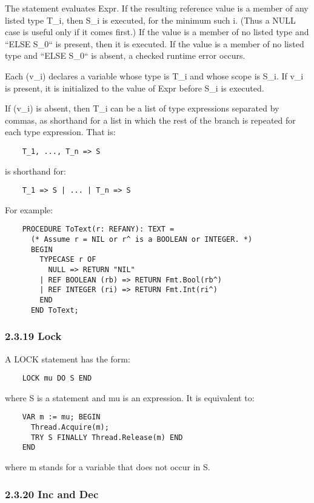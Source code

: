 \documentclass[10pt]{article}
\begin{document}
 The statement evaluates Expr. If the resulting reference value is a member of any listed type T\_i, then S\_i is executed, for the minimum such i. (Thus a NULL case is useful only if it comes first.) If the value is a member of no listed type and ``ELSE S\_0`` is present, then it is executed. If the value is a member of no listed type and ``ELSE S\_0`` is absent, a checked runtime error occurs. 


  Each (v\_i) declares a variable whose type is T\_i and whose scope is S\_i. If v\_i is present, it is initialized to the value of Expr before S\_i is executed. 


  If (v\_i) is absent, then T\_i can be a list of type expressions separated by commas, as shorthand for a list in which the rest of the branch is repeated for each type expression. That is: 
\begin{verbatim}
    T_1, ..., T_n => S
\end{verbatim}
 is shorthand for: 
\begin{verbatim}
    T_1 => S | ... | T_n => S
\end{verbatim}



  For example: 
\begin{verbatim}
    PROCEDURE ToText(r: REFANY): TEXT =
      (* Assume r = NIL or r^ is a BOOLEAN or INTEGER. *)
      BEGIN
        TYPECASE r OF
          NULL => RETURN "NIL"
        | REF BOOLEAN (rb) => RETURN Fmt.Bool(rb^)
        | REF INTEGER (ri) => RETURN Fmt.Int(ri^)
        END
      END ToText;
\end{verbatim}



 
\subsubsection*{2.3.19 Lock}


  A LOCK statement has the form: 
\begin{verbatim}
    LOCK mu DO S END
\end{verbatim}
 where S is a statement and mu is an expression. It is equivalent to: 
\begin{verbatim}
    VAR m := mu; BEGIN
      Thread.Acquire(m);
      TRY S FINALLY Thread.Release(m) END
    END
\end{verbatim}
 where m stands for a variable that does not occur in S. 


 
\subsubsection*{2.3.20 Inc and Dec}
\end{document}
